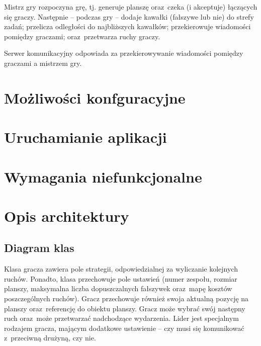 \documentclass[a4paper]{article}
\begin{document}
Mistrz gry rozpoczyna grę, tj. generuje planszę oraz~czeka (i akceptuje) łączących się graczy.
Następnie -- podczas gry -- dodaje kawałki (fałszywe lub nie) do strefy zadań; przelicza odległości do najbliższych kawałków; przekierowuje wiadomości pomiędzy graczami; oraz~przetwarza ruchy graczy.



Serwer komunikacyjny odpowiada za przekierowywanie wiadomości pomiędzy graczami a mistrzem gry.

\section{Możliwości konfguracyjne}


\section{Uruchamianie aplikacji}


\section{Wymagania niefunkcjonalne}


\section{Opis architektury}

\subsection{Diagram klas}


Klasa gracza zawiera pole strategii, odpowiedzialnej za wyliczanie kolejnych ruchów.
Ponadto, klasa przechowuje pole ustawień (numer zespołu, rozmiar planszy, maksymalna liczba dopuszczalnych fałszywek oraz~mapę kosztów poszczególnych ruchów).
Gracz przechowuje również swoja aktualną pozycję na planszy oraz~referencję do obiektu planszy.
Gracz może wybrać swój następny ruch oraz~może przetwarzać nadchodzące wydarzenia.
Lider jest specjalnym rodzajem gracza, mającym dodatkowe ustawienie -- czy musi się komunikować z~przeciwną drużyną, czy nie.
\end{document}
